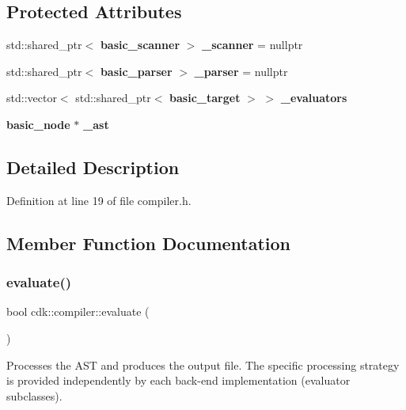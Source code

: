 \subsection*{Protected Attributes}
\begin{DoxyCompactItemize}
\item 
\mbox{\label{classcdk_1_1compiler_aae1fd7a956e254db62736223f36abfe1}} 
std\+::shared\+\_\+ptr$<$ \textbf{ basic\+\_\+scanner} $>$ {\bfseries \+\_\+scanner} = nullptr
\item 
\mbox{\label{classcdk_1_1compiler_a4cf06cfabdd2a17f1f00c875cf67f27a}} 
std\+::shared\+\_\+ptr$<$ \textbf{ basic\+\_\+parser} $>$ {\bfseries \+\_\+parser} = nullptr
\item 
\mbox{\label{classcdk_1_1compiler_a1effd69d16b8b813ee1abfa47a9152cb}} 
std\+::vector$<$ std\+::shared\+\_\+ptr$<$ \textbf{ basic\+\_\+target} $>$ $>$ {\bfseries \+\_\+evaluators}
\item 
\mbox{\label{classcdk_1_1compiler_a9d9ee8c3f17a0c87ba64f3e86aa7e52f}} 
\textbf{ basic\+\_\+node} $\ast$ {\bfseries \+\_\+ast}
\end{DoxyCompactItemize}


\subsection{Detailed Description}


Definition at line 19 of file compiler.\+h.



\subsection{Member Function Documentation}
\mbox{\label{classcdk_1_1compiler_a0c0d48f8b1101bb17bd1908785d62eff}} 
\subsubsection{evaluate()}
{\footnotesize\ttfamily bool cdk\+::compiler\+::evaluate (\begin{DoxyParamCaption}{ }\end{DoxyParamCaption})\hspace{0.3cm}{\ttfamily [inline]}}

Processes the A\+ST and produces the output file. The specific processing strategy is provided independently by each back-\/end implementation (evaluator subclasses). 

